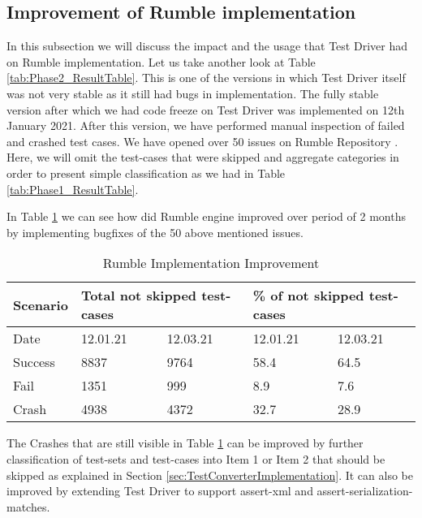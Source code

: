 \subsection{Improvement of Rumble implementation}
In this subsection we will discuss the impact and the usage that Test Driver had on Rumble implementation. Let us take another look at Table \ref{tab:Phase2_ResultTable}. This is one of the versions in which Test Driver itself was not very stable as it still had bugs in implementation. The fully stable version after which we had code freeze on Test Driver was implemented on 12th January 2021. After this version, we have performed manual inspection of failed and crashed test cases. We have opened over 50 issues on Rumble Repository \cite{RumbleRepository}. Here, we will omit the test-cases that were skipped and aggregate categories in order to present simple classification as we had in Table \ref{tab:Phase1_ResultTable}.

In Table \ref{tab:bugsimprovement} we can see how did Rumble engine improved over period of 2 months by implementing bugfixes of the 50 above mentioned issues.
 
\begin{table}[h!]
	\centering
	\begin{tabular}{|l|l|l|l|l|}
		\hline
		Scenario & \multicolumn{2}{l|}{Total not skipped test-cases} & \multicolumn{2}{l|}{\% of not skipped test-cases} \\ \hline
		Date     & 12.01.21                & 12.03.21                & 12.01.21                & 12.03.21                \\ \hline
		Success  & 8837                    & 9764                    & 58.4                    & 64.5                    \\ \hline
		Fail     & 1351                    & 999                     & 8.9                     & 7.6                     \\ \hline
		Crash    & 4938                    & 4372                    & 32.7                    & 28.9                    \\ \hline
	\end{tabular}
	\caption{Rumble Implementation Improvement}
	\label{tab:bugsimprovement}
\end{table}

The Crashes that are still visible in Table \ref{tab:bugsimprovement} can be improved by further classification of test-sets and test-cases into Item 1 or Item 2 that should be skipped as explained in Section \ref{sec:TestConverterImplementation}. It can also be improved by extending Test Driver to support assert-xml and assert-serialization-matches.

